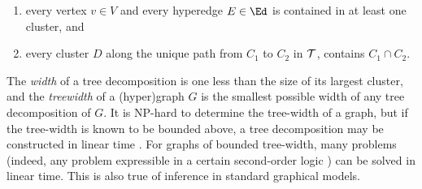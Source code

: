 \begin{enumerate}[nosep]
    \item every vertex $v \in V$ and every hyperedge $E \in \Ed$ is contained in at least one cluster, and
        \item every cluster $D$ along the unique path from $C_1$ to $C_2$ in $\cal T$,
         contains $C_1 \cap C_2$.
\end{enumerate}

The \emph{width} of a tree decomposition is one less than the size of its largest cluster,
and the \emph{treewidth} of a (hyper)graph $G$ is the smallest possible width of any tree decomposition of $G$.
It is NP-hard to determine the tree-width of a graph, but
if the tree-width is known to be bounded above, a tree decomposition may be constructed in linear time \parencite{bodlaender1993linear}.
For graphs of bounded tree-width, many problems 
(indeed, any problem expressible in a certain second-order logic \parencite{courcelle1990})
can be solved in
linear time.
This is also true of inference in 
standard graphical models.


